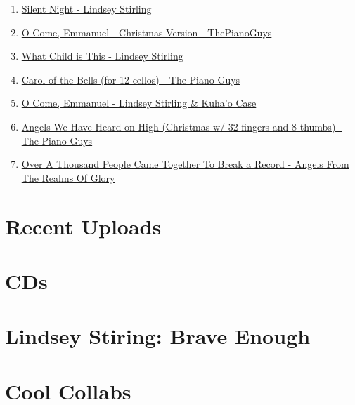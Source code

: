 \documentclass{book}
\numberwithin{equation}{section}
\begin{document}
\begin{enumerate}
    \item \href{https://www.youtube.com/watch?v=QmvwWxzg3lc}{Silent Night - Lindsey Stirling}
    \item \href{https://www.youtube.com/watch?v=ugV6QGcafEE}{O Come, Emmanuel - Christmas Version - ThePianoGuys}
    \item \href{https://www.youtube.com/watch?v=1A3i0GATnRI}{What Child is This - Lindsey Stirling}
    \item \href{https://www.youtube.com/watch?v=e9GtPX6c_kg}{Carol of the Bells (for 12 cellos) - The Piano Guys}
    \item \href{https://www.youtube.com/watch?v=ozVmO5LHJ2k}{O Come, Emmanuel - Lindsey Stirling \& Kuha'o Case}
    \item \href{https://www.youtube.com/watch?v=n543eKIdbUI}{Angels We Have Heard on High (Christmas w/ 32 fingers and 8 thumbs) - The Piano Guys}
    \item \href{https://www.youtube.com/watch?v=PrLoWt2tfqg}{Over A Thousand People Came Together To Break a Record - Angels From The Realms Of Glory}
\end{enumerate}

\section{Recent Uploads}

\section{CDs}

\section{Lindsey Stiring: Brave Enough}

\section{Cool Collabs}


\printbibliography[heading=bibintoc]
\end{document}
